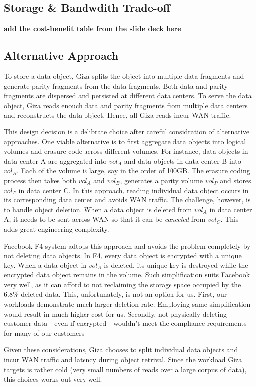 \subsection{Storage & Bandwdith Trade-off}

{\bf add the cost-benefit table from the slide deck here}

\subsection{Alternative Approach}

To store a data object, Giza splits the object into multiple data fragments and generate parity fragments from the data fragments. Both data and parity fragments are dispersed and persisted at different data centers. To serve the data object, Giza reads enouch data and parity fragments from multiple data centers and reconstructs the data object. Hence, all Giza reads incur WAN traffic.

This design decision is a delibrate choice after careful considration of alternative approaches. One viable alternative is to first aggregate data objects into logical volumes and erasure code across different volumes. For instance, data objects in data center A are aggregated into $vol_A$ and data objects in data center B into $vol_B$. Each of the volume is large, say in the order of 100GB. The erasure coding process then takes both $vol_A$ and $vol_B$,  generates a parity volume $vol_P$ and stores $vol_P$ in data center C. In this approach, reading individual data object occurs in its corresponding data center and avoids WAN traffic. The challenge, however, is to handle object deletion. When a data object is deleted from $vol_A$ in data center A, it needs to be sent across WAN so that it can be {\em canceled} from $vol_C$. This adds great engineering complexity.

Facebook F4 system adtops this approach and avoids the problem completely by not deleting data objects. In F4, every data object is encrypted with a unique key. When a data object in $vol_A$ is deleted, its unique key is destroyed while the encrypted data object remains in the volume. Such simplification suits Facebook very well, as it can afford to not reclaiming the storage space occupied by the  $6.8\%$ deleted data. This, unfortunately, is not an option for us. First, our workloads demonstrate much larger deletion rate. Employing same simplification would result in much higher cost for us. Secondly, not physically deleting customer data - even if encrypted - wouldn't meet the compliance requirements for many of our customers.

Given these considerations, Giza chooses to split individual data objects and incur WAN traffic and latency during object retrival. Since the workload Giza targets is rather cold (very small numbers of reads over a large corpus of data), this choices works out very well.